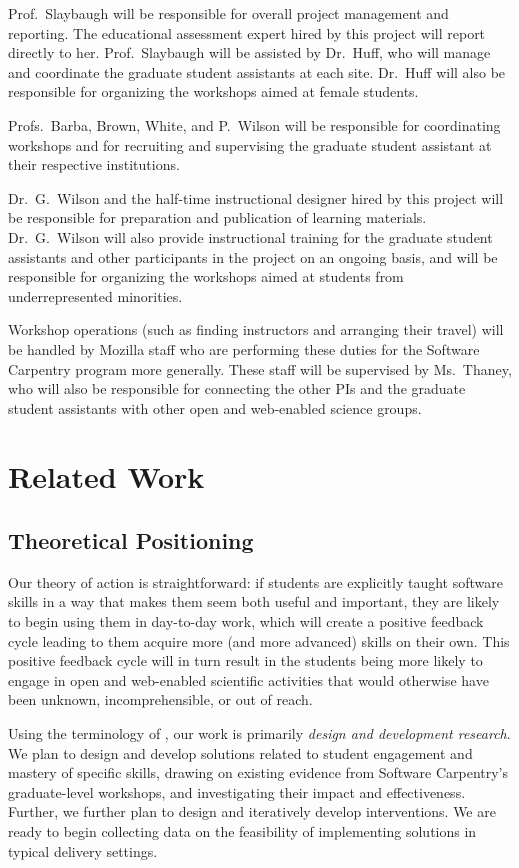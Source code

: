 \documentclass{proposalnsf}
\newlength{\up}
\begin{document}
Prof.\ Slaybaugh will be responsible for overall project management
and reporting.  The educational assessment expert hired by this
project will report directly to her.  Prof.\ Slaybaugh will be
assisted by Dr.\ Huff, who will manage and coordinate the graduate
student assistants at each site.  Dr.\ Huff will also be responsible
for organizing the workshops aimed at female students.

Profs.\ Barba, Brown, White, and P.\ Wilson will be responsible for
coordinating workshops and for recruiting and supervising the graduate
student assistant at their respective institutions.

Dr.\ G.\ Wilson and the half-time instructional designer hired by this
project will be responsible for preparation and publication of
learning materials.  Dr.\ G.\ Wilson will also provide instructional
training for the graduate student assistants and other participants in
the project on an ongoing basis, and will be responsible for
organizing the workshops aimed at students from underrepresented
minorities.

Workshop operations (such as finding instructors and arranging their
travel) will be handled by Mozilla staff who are performing these
duties for the Software Carpentry program more generally.  These staff
will be supervised by Ms.\ Thaney, who will also be responsible for
connecting the other PIs and the graduate student assistants with
other open and web-enabled science groups.

\section{Related Work}

\subsection{Theoretical Positioning}

Our theory of action is straightforward: if students are explicitly
taught software skills in a way that makes them seem both useful and
important, they are likely to begin using them in day-to-day work,
which will create a positive feedback cycle leading to them acquire
more (and more advanced) skills on their own. This positive feedback
cycle will in turn result in the students being more likely to engage
in open and web-enabled scientific activities that would otherwise
have been unknown, incomprehensible, or out of reach.

Using the terminology of \cite{guidelines}, our work is primarily
\emph{design and development research}. We plan to design and develop
solutions related to student engagement and mastery of specific
skills, drawing on existing evidence from Software Carpentry's
graduate-level workshops, and investigating their impact and
effectiveness. Further, we further plan to design and iteratively
develop interventions. We are ready to begin collecting data on the
feasibility of implementing solutions in typical delivery settings.
\end{document}
